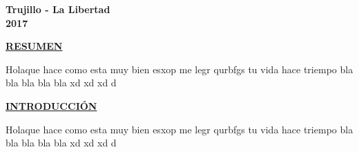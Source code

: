 \documentclass[a4paper, 12pt]{report}
\begin{document}
\vskip 3cm
\begin{center}    
	{\bf {\fontsize{14}{16.8}\selectfont Trujillo - La Libertad
	\\ 2017 }}
\end{center} 
\newpage
\pagestyle{plain}
\doublespacing
{}
\vspace*{6em}
\begin{center}
{\bf{\large{\underline{RESUMEN}}}}
\end{center}
\begin{justify}
Holaque hace como esta muy bien esxop me legr qurbfgs tu vida hace triempo bla bla bla bla bla xd xd xd d
\end{justify}
\newpage



\vspace*{6em}
\begin{center}
{\bf{\large{\underline{INTRODUCCI\'ON}}}}
\end{center}
\begin{justify}
Holaque hace como esta muy bien esxop me legr qurbfgs tu vida hace triempo bla bla bla bla bla xd xd xd d
\end{justify}
\newpage


\singlespacing
\renewcommand{\contentsname}{\centering\bf{\large{{\'INDICE GENERAL}}}}
\renewcommand{\listfigurename}{\centering\bf{\large{{LISTA DE FIGURAS}}}}
\renewcommand{\listtablename}{\centering\bf{\large{{LISTA DE TABLAS}}}}

\tableofcontents    %
\listoffigures      %
\listoftables       %

\doublespacing
\vspace*{5em}
\end{document}
